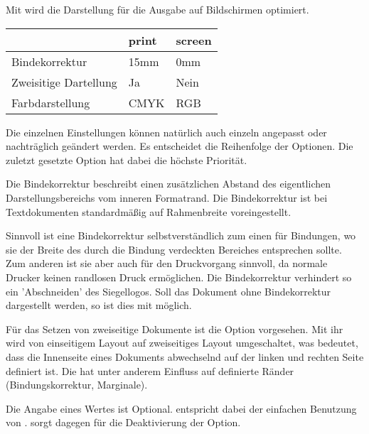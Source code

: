 Mit  wird die Darstellung
für die Ausgabe auf Bildschirmen optimiert.

\begin{center}
\begin{tabular}{lll}
                      & \textbf{\ttfamily print} & \textbf{\ttfamily screen}  \\
  \midrule
Bindekorrektur        & 15mm  & 0mm     \\
Zweisitige Dartellung & Ja    & Nein    \\
Farbdarstellung       & CMYK  & RGB
\end{tabular}
\end{center}

Die einzelnen Einstellungen können natürlich auch einzeln angepasst oder
nachträglich geändert werden. Es entscheidet die Reihenfolge der Optionen.
Die zuletzt gesetzte Option hat dabei die höchste Priorität.

\begin{Declaration}
\end{Declaration}

Die Bindekorrektur beschreibt einen zusätzlichen Abstand des eigentlichen
Darstellungsbereichs vom inneren Formatrand. Die Bindekorrektur
ist bei Textdokumenten standardmäßig auf Rahmenbreite voreingestellt.

Sinnvoll ist eine Bindekorrektur selbstverständlich zum einen für Bindungen,
wo sie der Breite des durch die Bindung verdeckten Bereiches entsprechen sollte.
Zum anderen ist sie aber auch für den Druckvorgang sinnvoll, da normale Drucker
keinen randlosen Druck ermöglichen. Die Bindekorrektur verhindert so \zB ein 'Abschneiden' des Siegellogos.
Soll das Dokument ohne Bindekorrektur dargestellt werden, so ist dies
mit  möglich.

\begin{Declaration}
\end{Declaration}

Für das Setzen von zweiseitige Dokumente ist die Option 
vorgesehen. Mit ihr wird von einseitigem Layout auf zweiseitiges Layout
umgeschaltet, was bedeutet, dass die Innenseite eines Dokuments abwechselnd
auf der linken und rechten Seite definiert ist. Die hat unter anderem Einfluss
auf definierte Ränder (Bindungskorrektur, Marginale).

Die Angabe eines Wertes ist Optional.  entspricht
dabei der einfachen Benutzung von .
 sorgt dagegen für die Deaktivierung der Option.

